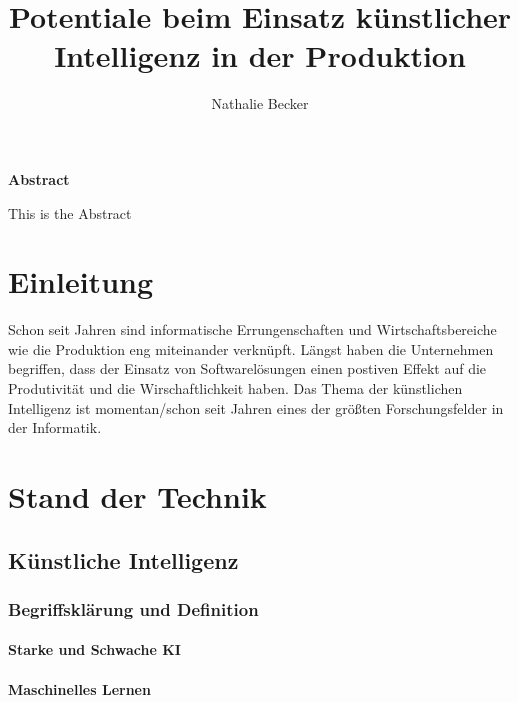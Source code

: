 \documentclass[a4paper,12pt, german]{report}
\begin{document}
\title{Potentiale beim Einsatz künstlicher Intelligenz in der Produktion}
\author{Nathalie Becker}


\begin{titlepage}
\maketitle
\end{titlepage}


\begin{center}
\textbf{Abstract}
\end{center}
This is the Abstract


\tableofcontents
\printacronyms

\chapter{Einleitung}

Schon seit Jahren sind informatische Errungenschaften und Wirtschaftsbereiche wie die Produktion eng miteinander verknüpft. Längst haben die Unternehmen begriffen, dass der Einsatz von Softwarelösungen einen postiven Effekt auf die Produtivität und die Wirschaftlichkeit haben.
Das Thema der künstlichen Intelligenz ist momentan/schon seit Jahren eines der größten Forschungsfelder in der Informatik. 


\chapter{Stand der Technik}

\section{Künstliche Intelligenz}

\subsection{Begriffsklärung und Definition}


\subsubsection{Starke und Schwache KI}

\subsubsection{Maschinelles Lernen}
\end{document}
